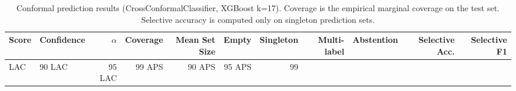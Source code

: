 \begin{table}
\caption{Conformal prediction results (CrossConformalClassifier, XGBoost k=17). Coverage is the empirical marginal coverage on the test set. Selective accuracy is computed only on singleton prediction sets.}
\label{tab:conformal_results}
\begin{tabular}{llrrrrrrrrr}
\toprule
Score & Confidence & $\alpha$ & Coverage & Mean Set Size & Empty & Singleton & Multi-label & Abstention & Selective Acc. & Selective F1 \\
\midrule
LAC & 90%
LAC & 95%
LAC & 99%
APS & 90%
APS & 95%
APS & 99%
\bottomrule
\end{tabular}
\end{table}
